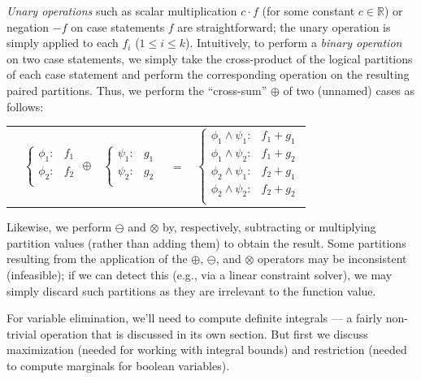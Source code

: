 \documentclass[letterpaper]{article}
\begin{document}
{\emph{Unary operations} such as scalar multiplication $c\cdot f$ (for
some constant $c \in \mathbb{R}$) or negation $-f$ on case statements
$f$ are straightforward; the unary operation is simply applied to each
$f_i$ ($1 \leq i \leq k$). Intuitively, to perform a \emph{binary
  operation} on two case statements, we simply take the cross-product
of the logical partitions of each case statement and perform the
corresponding operation on the resulting paired partitions.  Thus, we 
perform the ``cross-sum'' $\oplus$ of two (unnamed) cases as follows:
\vspace{-1mm}
{\footnotesize 
\begin{center}
\begin{tabular}{r c c c l}
&
\hspace{-6mm} 
  $\begin{cases}
    \phi_1: & f_1 \\ 
    \phi_2: & f_2 \\ 
  \end{cases}$
$\oplus$
&
\hspace{-4mm}
  $\begin{cases}
    \psi_1: & g_1 \\ 
    \psi_2: & g_2 \\ 
  \end{cases}$
&
\hspace{-2mm} 
$ = $
&
\hspace{-2mm}
  $\begin{cases}
  \phi_1 \wedge \psi_1: & f_1 + g_1 \\ 
  \phi_1 \wedge \psi_2: & f_1 + g_2 \\ 
  \phi_2 \wedge \psi_1: & f_2 + g_1 \\ 
  \phi_2 \wedge \psi_2: & f_2 + g_2 \\ 
  \end{cases}$
\end{tabular}
\end{center}
}
\normalsize
Likewise, we perform $\ominus$ and $\otimes$ by,
respectively, subtracting or multiplying partition values (rather than
adding them) to obtain the result.  
Some partitions resulting from
the application of the $\oplus$, $\ominus$, and $\otimes$ operators
may be inconsistent (infeasible); if we can detect this (e.g., via
a linear constraint solver), we may simply discard such 
partitions as they are irrelevant to the function value.

For variable elimination, we'll need to compute definite integrals
 --- a fairly non-trivial operation
that is discussed in its own section.  But first we discuss 
maximization (needed for working with integral bounds) and restriction
(needed to compute marginals for boolean variables).

}
\end{document}
